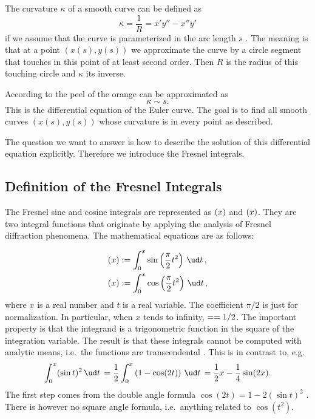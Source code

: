 \documentclass[12pt]{article}
\let\C=\relax
\DeclareMathOperator\C{C} %
\def\d#1{{\,\ud#1\,}}
\let\S=\relax
\DeclareMathOperator\S{S} %
\begin{document}
The curvature $\kappa$ of a smooth curve can be defined as 
\[  \kappa=\frac1R = x'y'' -x''y'
\] if we assume that the curve is parameterized in the arc length $s$ \cite{BH12}.  The meaning is that at a point $(x(s),y(s))$ we approximate the curve by a circle segment that touches in this point of at least second order.  Then $R$ is the radius of this touching circle and $\kappa$ its inverse.

According to \cite{BH12} the peel of the orange can be approximated as
\begin{equation}
  \kappa \sim s  \label{e:eulerSpiral}.
\end{equation}  This is the differential equation of the Euler curve.  The goal is to find all smooth curves $(x(s),y(s))$ whose curvature is in every point as described.

The question we want to answer is how to describe the solution of this differential equation explicitly.  Therefore we introduce the Fresnel integrals.


\subsection{Definition of the Fresnel Integrals}
The Fresnel sine and cosine integrals are represented as $\S(x)$ and $\C(x)$.  They are two integral functions that originate by applying the analysis of Fresnel diffraction phenomena. The mathematical equations are as follows:

\begin{align}
  \S(x) &:= \int_0^x  \sin\left(\frac\pi2 t^2\right) \d{t}, \label{e:FresnelS}\\
  \C(x) &:= \int_0^x \cos\left(\frac\pi2 t^2\right) \d{t}, \label{e:FresnelC}
\end{align}
where $x$ is a real number and $t$ is a real variable.   The coefficient $\pi/2$ is just for normalization.  In particular, when $x$ tends to infinity, $\S=\C=1/2$.  The important property is that the integrand is a trigonometric function in the square of the integration variable.  The result is that these integrals cannot be computed with analytic means, i.e.~the functions are transcendental \cite[p.195ff]{AS}.  This is in contrast to, e.g.
$$ \int_0^x (\sin t)^2 \d{t} = \frac12\int_0^x \left(1-\cos(2t)\right)\d{t} = \frac12x -\frac14\sin(2x).
$$  The first step comes from the double angle formula $\cos(2t)=1-2(\sin t)^2$ \cite{AS}.  There is however no square angle formula, i.e.~anything related to $\cos(t^2)$.
\end{document}
